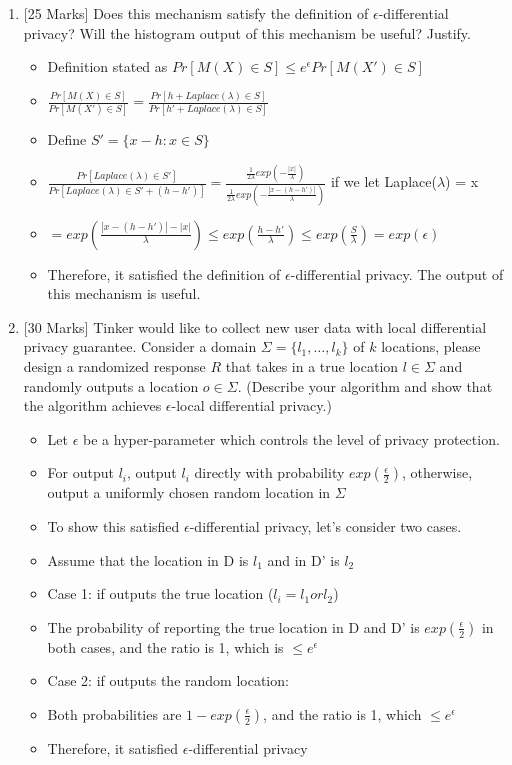 \documentclass{article}
\newcommand{\0}{\mathbf{0}}
\newcommand{\1}{\mathbf{1}}
\begin{document}
\begin{enumerate}
\begin{enumerate}
		\item {[25 Marks]} Does this mechanism satisfy the definition of 
		$\epsilon$-differential privacy? Will the histogram output of this mechanism be useful? Justify.
			\begin{itemize}
				\item Definition stated as $Pr[M(X)\in S]\leq e^\epsilon Pr[M(X')\in S]$
				\item $\frac{Pr[M(X)\in S]}{Pr[M(X')\in S]}=\frac{Pr[h+Laplace(\lambda)\in S]}{Pr[h'+Laplace(\lambda)\in S]}$
				\item Define $S'=\{x-h: x\in S\}$
				\item $\frac{Pr[Laplace(\lambda)\in S']}{Pr[Laplace(\lambda)\in S' + (h-h')]} = \frac{\frac{1}{2\lambda}exp(-\frac{|x|}{\lambda})}{\frac{1}{2\lambda}exp(-\frac{|x-(h-h')|}{\lambda})}$ if we let Laplace($\lambda$) = x
				\item $= exp(\frac{|x-(h-h')|-|x|}{\lambda}) \leq exp(\frac{h-h'}{\lambda})\leq exp(\frac{S}{\lambda}) = exp(\epsilon)$
				\item Therefore, it satisfied the definition of $\epsilon$-differential privacy. The output of this mechanism is useful.
			\end{itemize}


        \item {[30 Marks]} Tinker would like to collect new user data with local differential privacy guarantee. Consider a domain $\Sigma=\{l_1,\ldots,l_k\}$ of $k$ locations, please design a randomized response $R$ that takes in a true location $l\in \Sigma$ and randomly outputs a location $o\in \Sigma$. (Describe your algorithm and show that the algorithm achieves $\epsilon$-local differential privacy.)
			\begin{itemize}
				\item Let $\epsilon$ be a hyper-parameter which controls the level of privacy protection.
				\item For output $l_i$, output $l_i$ directly with probability $exp(\frac{\epsilon}{2})$, otherwise, output a uniformly chosen random location in $\Sigma$
				\item To show this satisfied $\epsilon$-differential privacy, let's consider two cases.
				\item Assume that the location in D is $l_1$ and in D' is $l_2$
				\item Case 1: if outputs the true location ($l_i = l_1 or l_2$)
				\item The probability of reporting the true location in D and D' is $exp(\frac{\epsilon}{2})$ in both cases, and the ratio is 1, which is $\leq e^\epsilon$
				\item Case 2: if outputs the random location:
				\item Both probabilities are $1-exp(\frac{\epsilon}{2})$, and the ratio is 1, which $\leq e^\epsilon$
				\item Therefore, it satisfied $\epsilon$-differential privacy
			\end{itemize}
	\end{enumerate}





\end{enumerate}
\end{document}
